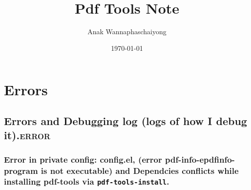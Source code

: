 \documentclass[11pt]{article}
\author{Anak Wannaphaschaiyong}
\date{\today}
\title{Pdf Tools Note}
\begin{document}
\maketitle
\tableofcontents


\section{Errors}
\label{sec:orgd66765a}
\subsection{Errors and Debugging log (logs of how I debug it).\hfill{}\textsc{error}}
\label{sec:orgcb5315a}
\subsubsection{Error in private config: config.el, (error pdf-info-epdfinfo-program is not executable) and Dependcies conflicts while installing pdf-tools via \texttt{pdf-tools-install}.}
\label{sec:org9103257}
\end{document}
